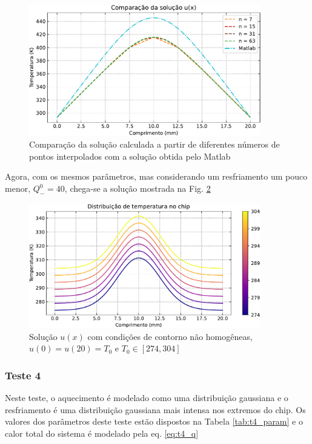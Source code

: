 \documentclass[a4,12pt]{horizon-theme}
\begin{document}
\begin{figure}[!ht]
  \centering
  \includegraphics[width=0.9\textwidth]{../plots/test_3_comp.pdf}
  \caption{Comparação da solução calculada a partir de diferentes números de pontos interpolados com a solução obtida pelo Matlab}
  \label{fig:t3_comp}
\end{figure}

\newpage
Agora, com os mesmos parâmetros, mas considerando um resfriamento um pouco menor, $Q^0_- = 40$, chega-se a solução mostrada na Fig. \ref{fig:t3_1}

\begin{figure}[!ht]
  \centering
  \includegraphics[width=0.9\textwidth]{../plots/test_3_1.pdf}
  \caption{Solução $u(x)$ com condições de contorno não homogêneas, $u(0) = u(20) = T_0$ e $T_0 \in [274, 304]$}
  \label{fig:t3_1}
\end{figure}


\clearpage
\subsubsection{Teste 4}
Neste teste, o aquecimento é modelado como uma distribuição gaussiana e o resfriamento é uma distribuição gaussiana mais intensa nos extremos do chip. Os valores dos parâmetros deste teste estão dispostos na Tabela \ref{tab:t4_param} e o calor total do sistema é modelado pela eq. \eqref{eq:t4_q}
\end{document}
